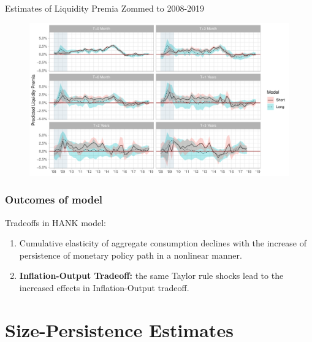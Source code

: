 \documentclass[10pt,aspectratio=169]{beamer}
\begin{document}
\begin{frame}{Estimates of Liquidity Premia Zommed to 2008-2019}
    \begin{figure}\centering 
        \begin{minipage}{0.87\textwidth}\centering
        \includegraphics[width=\textwidth]{estimates_of_liquidity_premia_plot_2008.pdf}
        \end{minipage}
    \end{figure}
\end{frame}

\begin{frame}{}
    
\end{frame}

\begin{frame}
\end{frame}


\begin{frame}\frametitle{Outcomes of \cite{KMV2018} model}
    \cite{KMV2018} Tradeoffs in HANK model:
    \begin{enumerate}
        \item \textbf{} Cumulative elasticity of aggregate consumption declines with the increase of persistence of monetary policy path in a nonlinear manner.
        \item \color{gray}\textbf{Inflation-Output Tradeoff:} the same Taylor rule shocks lead to the increased effects in Inflation-Output tradeoff.
    \end{enumerate}  
\end{frame}




\section{Size-Persistence Estimates}
\end{document}
